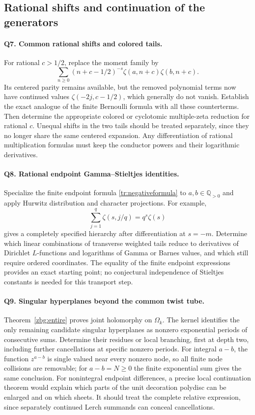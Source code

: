 \documentclass[11pt,letterpaper]{article}
\numberwithin{equation}{section}
\theoremstyle{plain}
\theoremstyle{definition}
\theoremstyle{remark}
\newcommand{\Q}{\mathbb Q}
\begin{document}
\subsection{Rational shifts and continuation of the generators}

\paragraph{Q7. Common rational shifts and colored tails.}
For rational $c>1/2$, replace the moment family by
\[
 \sum_{n\geq0}(n+c-1/2)^{-s}
                 \zeta(a,n+c)\zeta(b,n+c).
\]
Its centered parity remains available, but the removed polynomial
terms now have continued values $\zeta(-2j,c-1/2)$, which generally
do not vanish. Establish the exact analogue of the finite Bernoulli
formula with all these counterterms. Then determine the appropriate
colored or cyclotomic multiple-zeta reduction for rational $c$.
Unequal shifts in the two tails should be treated separately, since
they no longer share the same centered expansion. Any differentiation
of rational multiplication formulas must keep the conductor powers
and their logarithmic derivatives.

\paragraph{Q8. Rational endpoint Gamma--Stieltjes identities.}
Specialize the finite endpoint formula
\eqref{tr:negativeformula} to $a,b\in\Q_{>0}$ and apply Hurwitz
distribution and character projections. For example,
\[
 \sum_{j=1}^{q}\zeta(s,j/q)=q^s\zeta(s)
\]
gives a completely specified hierarchy after differentiation at
$s=-m$. Determine which linear combinations of transverse weighted
tails reduce to derivatives of Dirichlet $L$-functions and logarithms
of Gamma or Barnes values, and which still require ordered coordinates.
The equality of the finite endpoint expressions provides an exact
starting point; no conjectural independence of Stieltjes constants is
needed for this transport step.

\paragraph{Q9. Singular hyperplanes beyond the common twist tube.}
Theorem~\ref{zbg:entire} proves joint holomorphy on $\Omega_k$.
The kernel identifies the only remaining candidate singular
hyperplanes as nonzero exponential periods of consecutive sums.
Determine their residues or local branching, first at depth two,
including further cancellations at specific nonzero periods.
For integral $a-b$, the function $z^{a-b}$ is single valued near
every nonzero node, so all finite node collisions are removable;
for $a-b=N\geq0$ the finite exponential sum gives the same conclusion.
For nonintegral endpoint differences,
a precise local continuation theorem would explain which parts of
the unit decoration polydisc can be enlarged and on which sheets.
It should treat the complete relative expression, since separately
continued Lerch summands can conceal cancellations.
\end{document}
